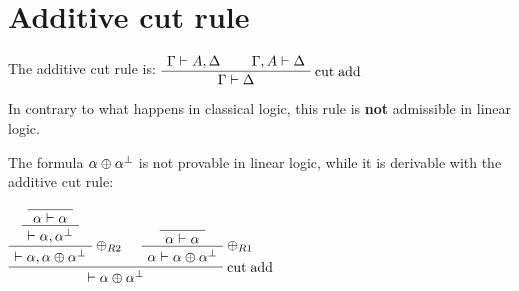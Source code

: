 \section{Additive cut rule}\label{additive-cut-rule}

The additive cut rule is: \(\AxRule{\Gamma\vdash A,\Delta}
\AxRule{\Gamma,A\vdash\Delta}
\LabelRule{\rulename{cut\;add}}
\BinRule{\Gamma\vdash\Delta}
\DisplayProof\)

In contrary to what happens in classical logic, this rule is
\textbf{not} admissible in linear logic.

The formula \(\alpha\oplus\alpha^\bot\) is not provable in linear logic,
while it is derivable with the additive cut rule:

\(\NulRule{\alpha\vdash\alpha}
\UnaRule{\vdash\alpha,\alpha\orth}
\LabelRule{\plus_{R2}}
\UnaRule{\vdash\alpha,\alpha\plus\alpha\orth}
\NulRule{\alpha\vdash\alpha}
\LabelRule{\plus_{R1}}
\UnaRule{\alpha\vdash\alpha\plus\alpha\orth}
\LabelRule{\rulename{cut\;add}}
\BinRule{\vdash\alpha\plus\alpha\orth}
\DisplayProof\)

